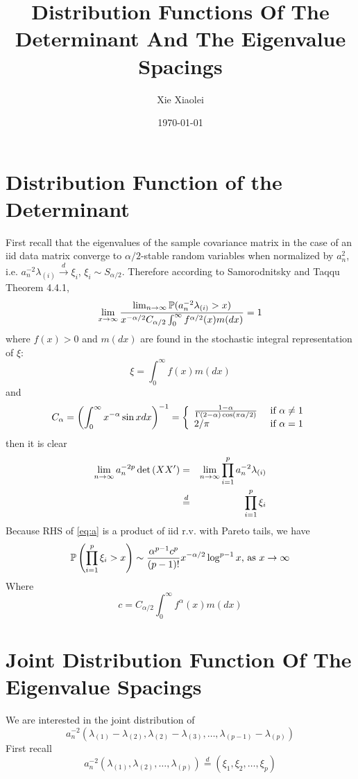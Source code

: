 \documentclass{article}
\title{Distribution Functions Of The Determinant And The Eigenvalue Spacings}
\author{Xie Xiaolei}
\date{\today}
\begin{document}
\maketitle
\section{Distribution Function of the Determinant}
First recall that the eigenvalues of the sample covariance matrix in
the case of an iid data matrix converge to $\alpha/2$-stable random
variables when normalized by $a_n^2$, i.e. $a_n^{-2} \lambda_{(i)}
\overset{d}{\to} \xi_{i}$, $\xi_{i} \sim S_{\alpha/2}$. Therefore
according to Samorodnitsky and Taqqu\cite{SamorodnitskyTaqqu1994}
Theorem 4.4.1,
\[
\lim_{x \to \infty} \frac{
  \lim_{n \to \infty} \P(a_n^{-2} \lambda_{(i)} > x)
}{
  x^{-\alpha/2} C_{\alpha/2} \int_{0}^{\infty} f^{\alpha/2}(x) m(dx)
} = 1
\]
where $f(x) > 0$ and $m(dx)$ are found in the stochastic integral
representation of $\xi$:
\[
\xi=\int_{0}^\infty f(x) m(dx)
\]
and
\[
C_\alpha = \left(
\int_0^\infty x^{-\alpha} \sin x dx
\right)^{-1} = \left\{
  \begin{array}{ll}
    {1 - \alpha \over \Gamma(2 - \alpha) \cos(\pi \alpha / 2)} & \text{ if } \alpha \neq 1
    \\
    2/\pi & \text{ if }\alpha = 1
  \end{array}
\right.
\]
then it is clear
\begin{eqnarray}
  \lim_{n \to \infty} a_n^{-2p} \det \mtx(XX') &=& \lim_{n \to \infty}
  \prod_{i=1}^p a_n^{-2} \lambda_{(i)} \nonumber \\
  &\overset{d}{=}& \prod_{i=1}^p \xi_{i} \label{eq:a}
\end{eqnarray}
Because RHS of \eqref{eq:a} is a product of iid r.v. with Pareto
tails, we have
\[
\P\left(
\prod_{i=1}^p \xi_{i} > x
\right) \sim {\alpha^{p-1} c^p \over (p-1)!}  x^{-\alpha/2} \log^{p-1} x 
\text{, as } x \to \infty
\]
Where
\[
c =  C_{\alpha/2} \int_{0}^{\infty} f^\alpha(x) m(dx)
\]

\section{Joint Distribution Function Of The Eigenvalue Spacings}
We are interested in the joint distribution of
\[
a_n^{-2}(\lambda_{(1)} - \lambda_{(2)}, \lambda_{(2)} - \lambda_{(3)},
\dots, \lambda_{(p-1)} - \lambda_{(p)})
\]
First recall
\[
a_n^{-2}(\lambda_{(1)}, \lambda_{(2)}, \dots, \lambda_{(p)})
\overset{d}{=} (\xi_1, \xi_2, \dots, \xi_p)
\]
\end{document}
